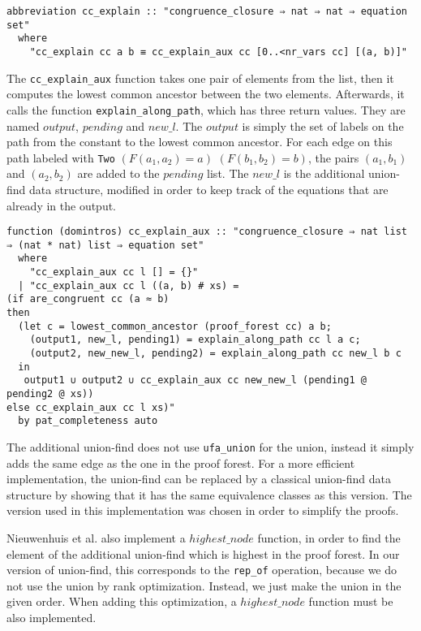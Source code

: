 \begin{lstlisting}
abbreviation cc_explain :: "congruence_closure ⇒ nat ⇒ nat ⇒ equation set"
  where
    "cc_explain cc a b ≡ cc_explain_aux cc [0..<nr_vars cc] [(a, b)]"
\end{lstlisting}

The \lstinline{cc_explain_aux} function takes one pair of elements from the list, then it
computes the lowest common ancestor between the two elements.
Afterwards, it calls the function \lstinline{explain_along_path}, which has three return values. They are named $output$, $pending$ and $new\_l$.
The $output$ is simply the set of labels on the path from the constant to the lowest common ancestor. For each edge on this path labeled with \lstinline|Two| $(F(a_1, a_2) = a)$ $(F(b_1, b_2) = b)$, the pairs $(a_1, b_1)$ and $(a_2, b_2)$ are added to the $pending$ list. The $new\_l$ is the additional union-find data structure, modified in order to keep track of the equations that are already in the output.

\begin{lstlisting}
function (domintros) cc_explain_aux :: "congruence_closure ⇒ nat list ⇒ (nat * nat) list ⇒ equation set"
  where
    "cc_explain_aux cc l [] = {}"
  | "cc_explain_aux cc l ((a, b) # xs) =
(if are_congruent cc (a ≈ b)
then
  (let c = lowest_common_ancestor (proof_forest cc) a b;
    (output1, new_l, pending1) = explain_along_path cc l a c;
    (output2, new_new_l, pending2) = explain_along_path cc new_l b c
  in
   output1 ∪ output2 ∪ cc_explain_aux cc new_new_l (pending1 @ pending2 @ xs))
else cc_explain_aux cc l xs)"
  by pat_completeness auto
\end{lstlisting}

The additional union-find does not use \lstinline{ufa_union} for the union, instead it simply adds the same edge as the one in the proof forest.
For a more efficient implementation, the union-find can be replaced by a classical union-find data structure by showing that it has the same equivalence classes as this version.
The version used in this implementation was chosen in order to simplify the proofs.

Nieuwenhuis et al. \cite{Nieuwenhuis} also implement a $highest\_node$ function, in order to find the element of the additional union-find which is highest in the proof forest.
In our version of union-find, this corresponds to the \lstinline{rep_of} operation, because we do not use the union by rank optimization. Instead, we just make the union in the given order. When adding this optimization, a $highest\_node$ function must be also implemented.

